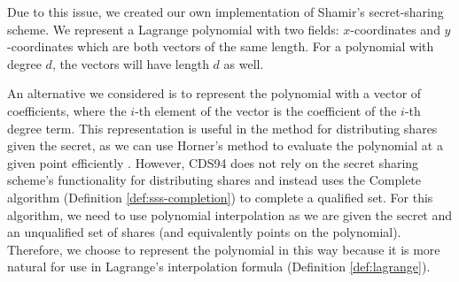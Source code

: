 Due to this issue, we created our own implementation of Shamir's secret-sharing scheme. 
We represent a Lagrange polynomial with two fields: 
$x$-coordinates and $y$-coordinates which are both vectors of the same length. 
For a polynomial with degree $d$, the vectors will have length $d$ as well. 

An alternative we considered is to represent the polynomial with a vector of coefficients, 
where the $i$-th element of the vector is the coefficient of the $i$-th degree term. This representation 
is useful in the method for distributing shares given the secret, as we can use Horner's method 
to evaluate the polynomial at a given point efficiently \cite{horner}. However, CDS94 does not 
rely on the secret sharing scheme's functionality for distributing shares and instead uses
the \textsf{Complete} algorithm (Definition \ref{def:sss-completion}) to complete a qualified set.
For this algorithm, we need to use polynomial interpolation as we are given the secret and an unqualified
set of shares (and equivalently points on the polynomial). 
Therefore, we choose to represent the polynomial in this way because it is more natural for use in 
Lagrange's interpolation formula (Definition \ref{def:lagrange}). 